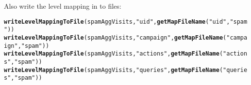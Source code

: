 \documentclass{article}\usepackage[]{graphicx}\usepackage[]{color}
\makeatletter
\newcommand{\hlstr}[1]{\textcolor[rgb]{0.192,0.494,0.8}{#1}}%
\newcommand{\hlstd}[1]{\textcolor[rgb]{0.345,0.345,0.345}{#1}}%
\newcommand{\hlkwd}[1]{\textcolor[rgb]{0.737,0.353,0.396}{\textbf{#1}}}%
\newenvironment{kframe}{%
 \def\at@end@of@kframe{}%
 \ifinner\ifhmode%
  \def\at@end@of@kframe{\end{minipage}}%
  \begin{minipage}{\columnwidth}%
 \fi\fi%
 \def\FrameCommand##1{\hskip\@totalleftmargin \hskip-\fboxsep
 \colorbox{shadecolor}{##1}\hskip-\fboxsep
     \hskip-\linewidth \hskip-\@totalleftmargin \hskip\columnwidth}%
 \MakeFramed {\advance\hsize-\width
   \@totalleftmargin\z@ \linewidth\hsize
   \@setminipage}}%
 {\par\unskip\endMakeFramed%
 \at@end@of@kframe}
\newenvironment{knitrout}{}{} %
\makeatother
\begin{document}
Also write the level mapping in to files:
\begin{knitrout}
\color{fgcolor}\begin{kframe}
\begin{alltt}
\hlkwd{writeLevelMappingToFile}\hlstd{(spamAggVisits,} \hlstr{"uid"}\hlstd{,} \hlkwd{getMapFileName}\hlstd{(}\hlstr{"uid"}\hlstd{,}\hlstr{"spam"}\hlstd{))}
\hlkwd{writeLevelMappingToFile}\hlstd{(spamAggVisits,} \hlstr{"campaign"}\hlstd{,} \hlkwd{getMapFileName}\hlstd{(}\hlstr{"campaign"}\hlstd{,}\hlstr{"spam"}\hlstd{))}
\hlkwd{writeLevelMappingToFile}\hlstd{(spamAggVisits,} \hlstr{"actions"}\hlstd{,} \hlkwd{getMapFileName}\hlstd{(}\hlstr{"actions"}\hlstd{,}\hlstr{"spam"}\hlstd{))}
\hlkwd{writeLevelMappingToFile}\hlstd{(spamAggVisits,} \hlstr{"queries"}\hlstd{,} \hlkwd{getMapFileName}\hlstd{(}\hlstr{"queries"}\hlstd{,}\hlstr{"spam"}\hlstd{))}
\end{alltt}
\end{kframe}
\end{knitrout}
\end{document}
